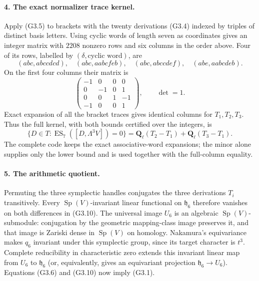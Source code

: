 \paragraph{4. The exact normalizer trace kernel.}
Apply (G3.5) to brackets with the twenty derivations
(G3.4) indexed by triples of distinct basis letters.
Using cyclic words of length seven as coordinates
gives an integer matrix with $2208$ nonzero rows and
six columns in the order above. Four of its rows,
labelled by $(\delta,\text{cyclic word})$, are
\[
 (abc,abccdcd),\quad(abc,aabcfeb),\quad
 (abc,abccdef),\quad(abe,aabcdeb).
\]
On the first four columns their matrix is
\[
 \begin{pmatrix}
 -1&0&0&0\\
 0&-1&0&1\\
 0&0&1&-1\\
 -1&0&0&1
 \end{pmatrix},\qquad\det=1.                              \tag{G3.9}
\]
Exact expansion of all the bracket traces gives identical
columns for $T_1,T_2,T_3$. Thus the full kernel, with
both bounds certified over the integers, is
\[
 \{D\in T:\operatorname{ES}_7([D,\Lambda^3V])=0\}
       =\mathbf Q_\ell(T_2-T_1)+\mathbf Q_\ell(T_3-T_1).
                                                               \tag{G3.10}
\]
The complete code keeps the exact associative-word
expansions; the minor alone supplies only the lower
bound and is used together with the full-column equality.

\paragraph{5. The arithmetic quotient.}
Permuting the three symplectic handles conjugates the
three derivations $T_i$ transitively. Every
$\operatorname{Sp}(V)$-invariant linear functional on
$\mathfrak h_6$ therefore vanishes on both differences
in (G3.10). The universal image $U_6$ is an algebraic
$\operatorname{Sp}(V)$-submodule: conjugation by the
geometric mapping-class image preserves it, and that
image is Zariski dense in $\operatorname{Sp}(V)$ on
homology. Nakamura's equivariance makes $q_6$ invariant
under this symplectic group, since its target character
is $t^3$. Complete reducibility in characteristic zero
extends this invariant linear map from $U_6$ to
$\mathfrak h_6$ (or, equivalently, gives an equivariant
projection $\mathfrak h_6\to U_6$). Equations (G3.6)
and (G3.10) now imply (G3.1).

